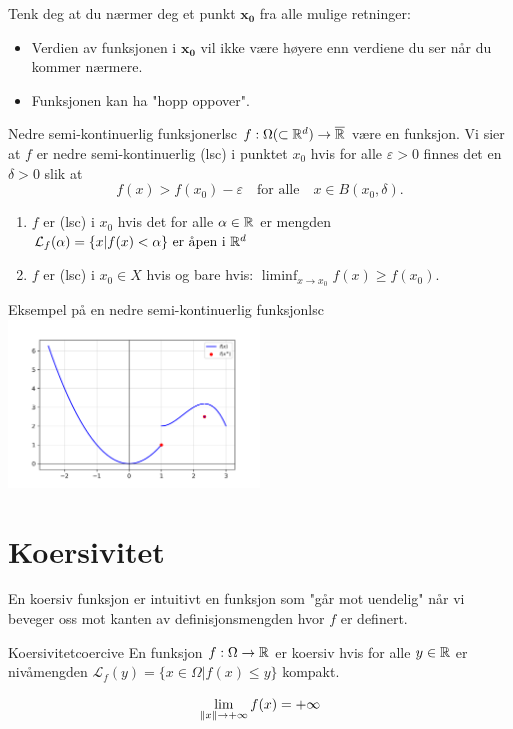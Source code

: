 Tenk deg at du nærmer deg et punkt \( \symbf{x_0} \) fra alle mulige retninger:
\begin{itemize}
  \item Verdien av funksjonen i \( \symbf{x_0} \) vil ikke være høyere enn verdiene du ser når du kommer nærmere.
  \item Funksjonen kan ha "hopp oppover".
\end{itemize}


\begin{definition}{Nedre semi-kontinuerlig funksjoner}{lsc}
  \(f: \Omega (\subset \mathbb{R}^d) \to \overline{\mathbb{R}}\) være en funksjon. Vi sier at \(f\) er nedre semi-kontinuerlig (lsc) i punktet \(x_0\) hvis for alle \(\varepsilon > 0\) finnes det en \(\delta > 0\) slik at
  \[
    f(x) > f(x_0) - \varepsilon \quad \text{for alle} \quad x \in B(x_0, \delta).
  \]
  \begin{enumerate}
    \item \(f\) er (lsc) i \(x_0\) hvis det for alle \(\alpha \in \mathbb{R}\) er mengden \(\mathcal{L}_f(\alpha) = \{x | f(x) < \alpha \} \text{ er åpen i } \mathbb{R}^d\)
    \item \(f\) er (lsc) i \(x_0 \in X\) hvis og bare hvis: \(\liminf_{x \to x_0} f(x) \geq f(x_0)\).
  \end{enumerate}
\end{definition}
\begin{example}{Eksempel på en nedre semi-kontinuerlig funksjon}{lsc}
  \includegraphics[width=0.5\textwidth]{figures/example_lsc.png}
\end{example}

\section{Koersivitet}

En koersiv funksjon er intuitivt en funksjon som "går mot uendelig" når vi beveger oss mot kanten av definisjonsmengden hvor \( f \) er definert.

\begin{definition}{Koersivitet}{coercive}
  En funksjon \(f: \Omega \to \mathbb{R}\) er koersiv hvis for alle \(y \in \mathbb{R}\) er nivåmengden \(\mathcal{L}_f(y) = \{x \in \Omega | f(x) \leq y\}\) kompakt.

  \[
    \lim_{\lVert x\rVert \to +\infty} f(x) = +\infty
  \]
\end{definition}

